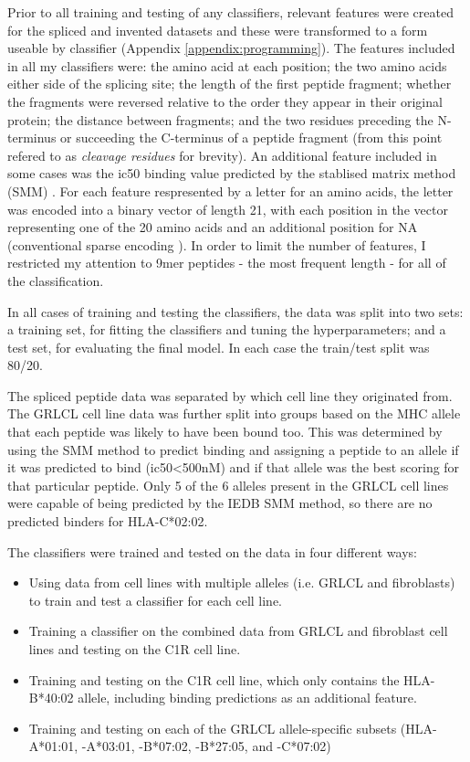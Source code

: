 \documentclass[10pt,a4paper,twoside,twocolumn]{article}
\begin{document}
Prior to all training and testing of any classifiers, relevant features were created for the spliced and invented datasets and these were transformed to a form useable by classifier (Appendix \ref{appendix:programming}). The features included in all my classifiers were: the amino acid at each position; the two amino acids either side of the splicing site; the length of the first peptide fragment; whether the fragments were reversed relative to the order they appear in their original protein; the distance between fragments; and the two residues preceding the N-terminus or succeeding the C-terminus of a peptide fragment (from this point refered to as \textit{cleavage residues} for brevity). An additional feature included in some cases was the ic50 binding value predicted by the stablised matrix method (SMM) \cite{Peters2005}. For each feature respresented by a letter for an amino acids, the letter was encoded into a binary vector of length 21, with each position in the vector representing one of the 20 amino acids and an additional position for NA (conventional sparse encoding \cite{Qian1988}). In order to limit the number of features, I restricted my attention to 9mer peptides - the most frequent length - for all of the classification.

In all cases of training and testing the classifiers, the data was split into two sets: a training set, for fitting the classifiers and tuning the hyperparameters; and a test set, for evaluating the final model. In each case the train/test split was 80/20.

The spliced peptide data was separated by which cell line they originated from. The GRLCL cell line data was further split into groups based on the MHC allele that each peptide was likely to have been bound too. This was determined by using the SMM method to predict binding and assigning a peptide to an allele if it was predicted to bind (ic50<500nM) and if that allele was the best scoring for that particular peptide. Only 5 of the 6 alleles present in the GRLCL cell lines were capable of being predicted by the IEDB SMM method, so there are no predicted binders for HLA-C*02:02.

The classifiers were trained and tested on the data in four different ways:
\begin{itemize}
	\item Using data from cell lines with multiple alleles (i.e. GRLCL and fibroblasts) to train and test a classifier for each cell line.
	\item Training a classifier on the combined data from GRLCL and fibroblast cell lines and testing on the C1R cell line.
	\item Training and testing on the C1R cell line, which only contains the HLA-B*40:02 allele, including binding predictions as an additional feature.
	\item Training and testing on each of the GRLCL allele-specific subsets (HLA-A*01:01, \mbox{-A*03:01}, -B*07:02, -B*27:05, and -C*07:02)
\end{itemize}
\end{document}

